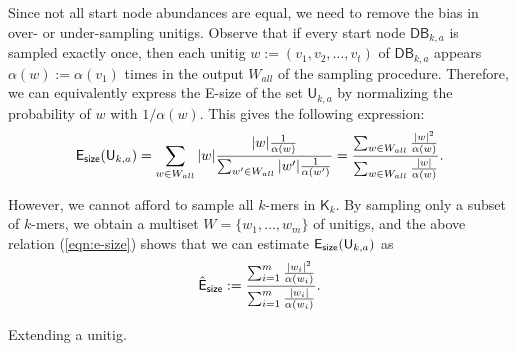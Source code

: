 \documentclass[a4paper,11pt]{article}
\newcommand{\DB}{\mathsf{DB}_{k,a}}
\newcommand{\U}{\mathsf{U}_{k,a}}
\newcommand{\K}{\mathsf{K}}
\newcommand{\abu}{\alpha}
\newcommand{\esize}{{\sf E_{size}}}
\begin{document}
Since not all start node abundances are equal, we need to remove the bias in over- or under-sampling unitigs. Observe that if every start node $\DB$ is sampled exactly once, then each unitig $w := (v_1,v_2,\dots,v_t)$ of $\DB$ appears $\abu(w) := \abu(v_1)$ times in the output $W_{all}$ of the sampling procedure. Therefore, we can equivalently express the E-size of the set $\U$ by normalizing the probability of $w$ with $1/\abu(w)$. This gives the following expression:
\begin{equation}
\esize(\U) = \sum_{w \in W_{all}} |w| \frac{|w|\frac{1}{\alpha(w)}}{\sum_{w' \in W_{all}}|w'|\frac{1}{\alpha(w')}} = \frac{\sum_{w \in W_{all}}\frac{|w|^2}{\alpha(w)}}{\sum_{w \in W_{all}}\frac{|w|}{\alpha(w)}}.
\label{eqn:e-size}
\end{equation}

However, we cannot afford to sample all $k$-mers in $\K_k$. By sampling only a subset of $k$-mers, we obtain a multiset $W = \{w_1,\dots,w_m\}$ of unitigs, and the above relation (\ref{eqn:e-size}) shows that we can estimate $\esize(\U)$ as 
\[\hat{{\sf E}}_{\sf size} := \frac{\sum_{i = 1}^{m}\frac{|w_i|^2}{\alpha(w_i)}}{\sum_{i=1}^{m}\frac{|w_i|}{\alpha(w_i)}}.\]

\begin{algorithm}[h]
\caption{Extending a unitig.\label{alg:extending-unitig}}


\end{algorithm}
\end{document}
